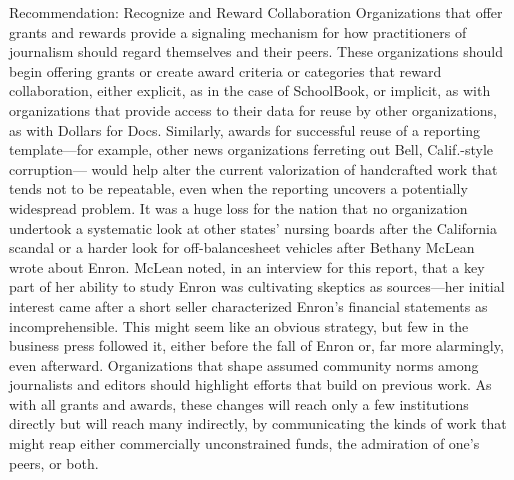 Recommendation: Recognize and Reward Collaboration
Organizations that offer grants and rewards provide a signaling mechanism
for how practitioners of journalism should regard themselves and
their peers.
These organizations should begin offering grants or create award criteria
or categories that reward collaboration, either explicit, as in the case
of SchoolBook, or implicit, as with organizations that provide access
to their data for reuse by other organizations, as with Dollars for Docs.
Similarly, awards for successful reuse of a reporting template—for example,
other news organizations ferreting out Bell, Calif.-style corruption—
would help alter the current valorization of handcrafted work
that tends not to be repeatable, even when the reporting uncovers a
potentially widespread problem. It was a huge loss for the nation that
no organization undertook a systematic look at other states’ nursing
boards after the California scandal or a harder look for off-balancesheet
vehicles after Bethany McLean wrote about Enron.
McLean noted, in an interview for this report, that a key part of her
ability to study Enron was cultivating skeptics as sources—her initial interest
came after a short seller characterized Enron’s financial statements
as incomprehensible. This might seem like an obvious strategy, but few
in the business press followed it, either before the fall of Enron or, far
more alarmingly, even afterward.
Organizations that shape assumed community norms among journalists
and editors should highlight efforts that build on previous work.
As with all grants and awards, these changes will reach only a few institutions
directly but will reach many indirectly, by communicating
the kinds of work that might reap either commercially unconstrained
funds, the admiration of one’s peers, or both.


